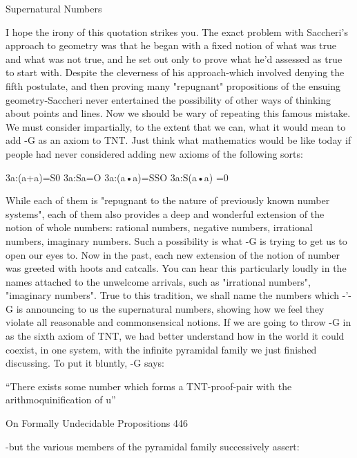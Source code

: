                                  Supernatural Numbers

I hope the irony of this quotation strikes you. The exact problem with Saccheri's approach
to geometry was that he began with a fixed notion of what was true and what was not
true, and he set out only to prove what he'd assessed as true to start with. Despite the
cleverness of his approach-which involved denying the fifth postulate, and then proving
many "repugnant" propositions of the ensuing geometry-Saccheri never entertained the
possibility of other ways of thinking about points and lines. Now we should be wary of
repeating this famous mistake. We must consider impartially, to the extent that we can,
what it would mean to add -G as an axiom to TNT. Just think what mathematics would
be like today if people had never considered adding new axioms of the following sorts:

                              3a:(a+a)=S0
                              3a:Sa=O
                              3a:(a•a)=SSO
                              3a:S(a•a) =0

While each of them is "repugnant to the nature of previously known number systems",
each of them also provides a deep and wonderful extension of the notion of whole
numbers: rational numbers, negative numbers, irrational numbers, imaginary numbers.
Such a possibility is what -G is trying to get us to open our eyes to. Now in the past, each
new extension of the notion of number was greeted with hoots and catcalls. You can hear
this particularly loudly in the names attached to the unwelcome arrivals, such as
"irrational numbers", "imaginary numbers". True to this tradition, we shall name the
numbers which -'-G is announcing to us the supernatural numbers, showing how we feel
they violate all reasonable and commonsensical notions.
        If we are going to throw -G in as the sixth axiom of TNT, we had better
understand how in the world it could coexist, in one system, with the infinite pyramidal
family we just finished discussing. To put it bluntly, -G says:

               “There exists some number which forms a TNT-proof-pair with the
                               arithmoquinification of u”




On Formally Undecidable Propositions                                                    446

-but the various members of the pyramidal family successively assert:

